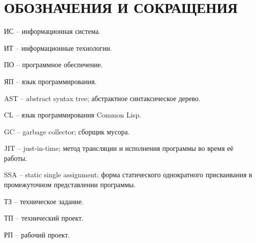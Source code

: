 \section*{ОБОЗНАЧЕНИЯ И СОКРАЩЕНИЯ}

ИС -- информационная система.

ИТ -- информационные технологии. 

ПО -- программное обеспечение.

ЯП -- язык программирования.

AST -- abstract syntax tree; абстрактное синтаксическое дерево.

CL -- язык программирования Common Lisp.

GC -- garbage collector; сборщик мусора.

JIT -- just-in-time; метод трансляции и исполнения программы во время её работы.

SSA -- static single assignment; форма статического однократного присваивания в промежуточном представлении программы.

ТЗ -- техническое задание.

ТП -- технический проект.

РП -- рабочий проект.
